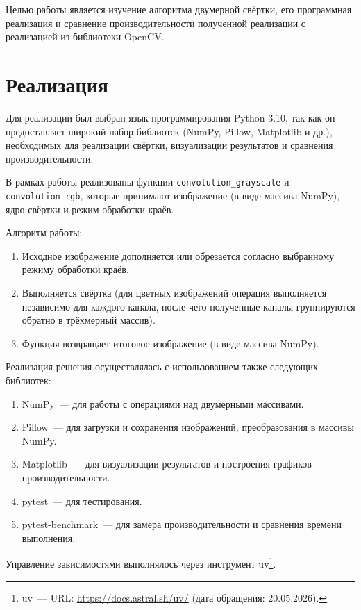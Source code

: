\documentclass[a4paper]{article}
\begin{document}
Целью работы является изучение алгоритма двумерной свёртки, его программная реализация и сравнение производительности полученной реализации с реализацией из библиотеки OpenCV.

\section{Реализация}

Для реализации был выбран язык программирования Python 3.10, так как он предоставляет широкий набор библиотек (NumPy, Pillow, Matplotlib и др.), необходимых для реализации свёртки, визуализации результатов и сравнения производительности.

В рамках работы реализованы функции \texttt{convolution\_grayscale} и \texttt{convolution\_rgb}, которые принимают изображение (в виде массива NumPy), ядро свёртки и режим обработки краёв.

Алгоритм работы:
\begin{enumerate}
    \item Исходное изображение дополняется или обрезается согласно выбранному режиму обработки краёв.
    \item Выполняется свёртка (для цветных изображений операция выполняется независимо для каждого канала, после чего полученные каналы группируются обратно в трёхмерный массив).
    \item Функция возвращает итоговое изображение (в виде массива NumPy).
\end{enumerate}

Реализация решения осуществлялась с использованием также следующих библиотек:
\begin{enumerate}
    \item NumPy~--- для работы с операциями над двумерными массивами.
    \item Pillow~--- для загрузки и сохранения изображений, преобразования в массивы NumPy.
    \item Matplotlib~--- для визуализации результатов и построения графиков производительности.
    \item pytest~--- для тестирования.
    \item pytest-benchmark~--- для замера производительности и сравнения времени выполнения.
\end{enumerate}

Управление зависимостями выполнялось через инструмент uv\footnote{uv~--- URL: \url{https://docs.astral.sh/uv/} (дата обращения: 20.05.2026).}.
\end{document}
